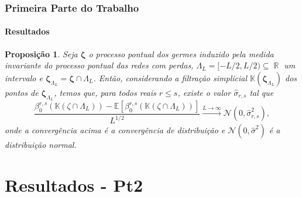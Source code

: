 \documentclass[11pt]{beamer}
\DeclareMathOperator{\R}{\mathbb{R}}
\theoremstyle{remark}
\theoremstyle{definition}
\theoremstyle{plain}
\newtheorem{proposicao}{Proposição}
\begin{document}
    \begin{frame}
        \frametitle{Primeira Parte do Trabalho}
        \framesubtitle{Resultados}

        \begin{proposicao}\label{prop:conv_quase_certa}
          Seja $\bm{\zeta}$ o processo pontual dos germes induzido
          pela medida invariante do processo pontual das redes
          com perdas, $\Lambda_{L} = [-L/2, L/2) \subseteq \R$ um
          intervalo e $\bm{\zeta}_{\Lambda_{L}} = \bm{\zeta} \cap
          \Lambda_{L}$. Então, considerando a filtração simplicial
          $\mathbb{K}( \bm{\zeta}_{\Lambda_{L}} )$ dos pontos de
          $\bm{\zeta}_{\Lambda_{L}}$, temos que, para todos reais $r
          \leq s$, existe o valor $\hat{ \sigma }_{r,s}$ tal que
          \begin{equation} \label{eq:main_result_5}
            \frac{
              \beta_{0}^{r,s}( \mathbb{K}( \zeta \cap \Lambda_{L} ) ) -
              \mathbb{E}\left[
                  \beta_{0}^{r,s}( \mathbb{K}( \zeta \cap \Lambda_{L} ) )
                   \right]
            }
            {L^{1/2}}
            \xrightarrow{L \to \infty} \mathcal{N}(0,\hat{\sigma}^{2}_{r,s}),
          \end{equation}
          onde a convergência acima é a convergência de distribuição e
          $\mathcal{N}(0,\hat{\sigma}^{2})$ é a distribuição normal.
        \end{proposicao}
    \end{frame}

\section{Resultados - Pt2}
    \begin{frame}

        \begin{figure}
        \end{figure}
    \end{frame}
\end{document}
